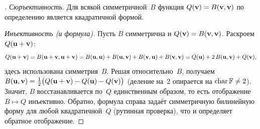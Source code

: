 \begin{proof}[]
\emph{Сюръективность.} Для всякой симметричной~$B$ функция
$Q(\mathbf{v}) = B(\mathbf{v}, \mathbf{v})$ по определению является
квадратичной формой.

\emph{Инъективность (и формула).} Пусть $B$ симметрична и
$Q(\mathbf{v}) = B(\mathbf{v}, \mathbf{v})$. Раскроем $Q(\mathbf{u} + \mathbf{v})$:
\[
  Q(\mathbf{u} + \mathbf{v}) = B(\mathbf{u} + \mathbf{v}, \mathbf{u} + \mathbf{v})
  = B(\mathbf{u}, \mathbf{u}) + B(\mathbf{u}, \mathbf{v}) + B(\mathbf{v}, \mathbf{u}) + B(\mathbf{v}, \mathbf{v})
  = Q(\mathbf{u}) + 2\,B(\mathbf{u}, \mathbf{v}) + Q(\mathbf{v}),
\]
здесь использована симметрия~$B$. Решая относительно~$B$, получаем
$B(\mathbf{u}, \mathbf{v}) = \tfrac{1}{2}\bigl(Q(\mathbf{u} + \mathbf{v}) - Q(\mathbf{u}) - Q(\mathbf{v})\bigr)$
(деление на~$2$ опирается на $\operatorname{char} \mathbb{F} \neq 2$). Значит,
$B$ восстанавливается по~$Q$ единственным образом, то есть отображение
$B \mapsto Q$ инъективно. Обратно, формула справа задаёт
симметричную билинейную форму для любой квадратичной~$Q$ (рутинная
проверка), что и определяет обратное отображение.
\end{proof}

